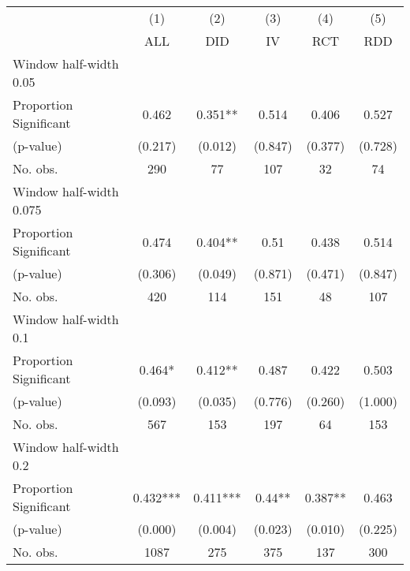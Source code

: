 
\def\sym#1{\ifmmode^{#1}\else\(^{#1}\)\fi}
\begin{tabular}{l*{5}{c}}
\hline\hline
& \multicolumn{1}{c}{(1)} &  \multicolumn{1}{c}{(2)} &  \multicolumn{1}{c}{(3)} &  \multicolumn{1}{c}{(4)} &  \multicolumn{1}{c}{(5)}\\
& \multicolumn{1}{c}{ALL} &  \multicolumn{1}{c}{DID} &  \multicolumn{1}{c}{IV} &  \multicolumn{1}{c}{RCT} &  \multicolumn{1}{c}{RDD}\\

\hline
\hline
Window half-width 0.05\\

Proportion Significant& 0.462 &  0.351** &  0.514 &  0.406 &  0.527\\

(p-value) & (0.217) &  (0.012) &  (0.847) &  (0.377) &  (0.728)\\

No. obs.& 290 &  77 &  107 &  32 &  74\\

\hline
Window half-width 0.075\\

Proportion Significant& 0.474 &  0.404** &  0.51 &  0.438 &  0.514\\

(p-value) & (0.306) &  (0.049) &  (0.871) &  (0.471) &  (0.847)\\

No. obs.& 420 &  114 &  151 &  48 &  107\\

\hline
Window half-width 0.1\\

Proportion Significant& 0.464* &  0.412** &  0.487 &  0.422 &  0.503\\

(p-value) & (0.093) &  (0.035) &  (0.776) &  (0.260) &  (1.000)\\

No. obs.& 567 &  153 &  197 &  64 &  153\\

\hline
Window half-width 0.2\\

Proportion Significant& 0.432*** &  0.411*** &  0.44** &  0.387** &  0.463\\

(p-value) & (0.000) &  (0.004) &  (0.023) &  (0.010) &  (0.225)\\

No. obs.& 1087 &  275 &  375 &  137 &  300\\


\end{tabular}
